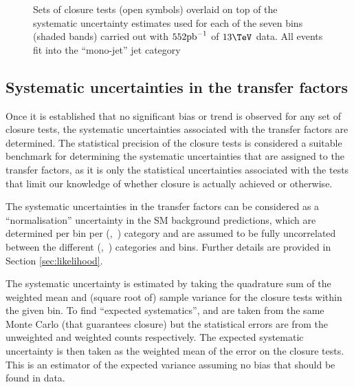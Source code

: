 \begin{figure}[h!]
  \begin{center}
    \caption{Sets of closure tests (open symbols) overlaid on top of
      the systematic uncertainty estimates used for each of the seven
      \scalht bins (shaded bands) carried out with $552\ipb$ of
      $13\tev$ data. All events fit into the ``mono-jet'' jet
      category}
    \label{fig:closureDataMono}
  \end{center} 
\end{figure}

\subsection{Systematic uncertainties in the transfer factors\label{sec:syst-from-closure}}

Once it is established that no significant bias or trend is observed
for any set of closure tests, the systematic uncertainties associated
with the transfer factors are determined. The statistical precision of
the closure tests is considered a suitable benchmark for determining
the systematic uncertainties that are assigned to the transfer
factors, as it is only the statistical uncertainties associated with
the tests that limit our knowledge of whether closure is actually
achieved or otherwise.

The systematic uncertainties in the transfer factors can be considered
as a ``normalisation'' uncertainty in the SM background predictions,
which are determined per \scalht bin per (\njet,~\nb) category and are
assumed to be fully uncorrelated between the different (\njet,~\nb)
categories and \scalht bins. Further details are provided in Section
\ref{sec:likelihood}. 

The systematic uncertainty is estimated by taking the quadrature sum
of the weighted mean and (square root of) sample variance for the
closure tests within the given \scalht bin. To find ``expected
systematics'', \nobs and \npre are taken from the same Monte Carlo
(that guarantees closure) but the statistical errors are from the
unweighted and weighted counts respectively. The expected systematic
uncertainty is then taken as the weighted mean of the error on the
closure tests. This is an estimator of the expected variance assuming
no bias that should be found in data. 

